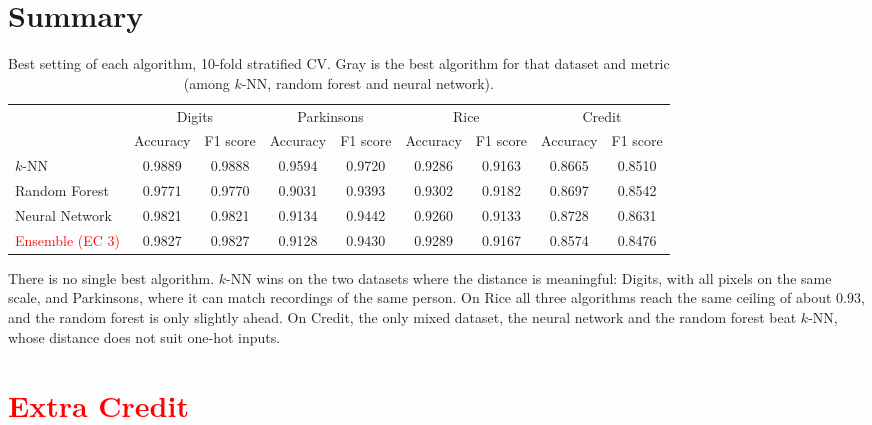 \documentclass{article}
\begin{document}
\newpage
\section{Summary}

\begin{table}[H]
\centering
\small
\begin{tabular}{l cc cc cc cc}
\toprule
 & \multicolumn{2}{c}{Digits} & \multicolumn{2}{c}{Parkinsons} & \multicolumn{2}{c}{Rice} & \multicolumn{2}{c}{Credit} \\
\cmidrule(lr){2-3} \cmidrule(lr){4-5} \cmidrule(lr){6-7} \cmidrule(lr){8-9}
 & Accuracy & F1 score & Accuracy & F1 score & Accuracy & F1 score & Accuracy & F1 score \\
\midrule
$k$-NN & \cellcolor{gray!30}0.9889 & \cellcolor{gray!30}0.9888 & \cellcolor{gray!30}0.9594 & \cellcolor{gray!30}0.9720 & 0.9286 & 0.9163 & 0.8665 & 0.8510 \\
Random Forest & 0.9771 & 0.9770 & 0.9031 & 0.9393 & \cellcolor{gray!30}0.9302 & \cellcolor{gray!30}0.9182 & 0.8697 & 0.8542 \\
Neural Network & 0.9821 & 0.9821 & 0.9134 & 0.9442 & 0.9260 & 0.9133 & \cellcolor{gray!30}0.8728 & \cellcolor{gray!30}0.8631 \\
\midrule
\textcolor{red}{Ensemble (EC 3)} & 0.9827 & 0.9827 & 0.9128 & 0.9430 & 0.9289 & 0.9167 & 0.8574 & 0.8476 \\
\bottomrule
\end{tabular}
\caption{Best setting of each algorithm, 10-fold stratified CV. Gray is the best algorithm for that dataset and metric (among $k$-NN, random forest and neural network).}
\end{table}

There is no single best algorithm. $k$-NN wins on the two datasets where the distance is meaningful: Digits, with
all pixels on the same scale, and Parkinsons, where it can match recordings of the same person. On Rice all three
algorithms reach the same ceiling of about 0.93, and the random forest is only slightly ahead. On Credit, the only
mixed dataset, the neural network and the random forest beat $k$-NN, whose distance does not suit one-hot inputs.

\section*{\textcolor{red}{Extra Credit}}
\end{document}
